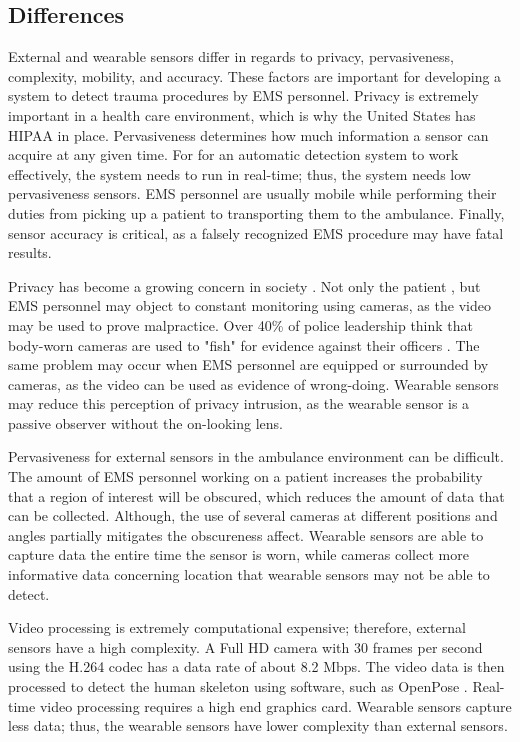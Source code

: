 \subsection{Differences}
External and wearable sensors differ in regards to privacy, pervasiveness, complexity, mobility, and accuracy. These factors are important for developing a system to detect trauma procedures by EMS personnel. Privacy is extremely important in a health care environment, which is why the United States has HIPAA in place. Pervasiveness determines how much information a sensor can acquire at any given time. For for an automatic detection system to work effectively, the system needs to run in real-time; thus, the system needs low pervasiveness sensors. EMS personnel are usually mobile while performing their duties from picking up a patient to transporting them to the ambulance. Finally, sensor accuracy is critical, as a falsely recognized EMS procedure may have fatal results.
\par Privacy has become a growing concern in society \cite{privacyindex}. Not only the patient \cite{Arning2015}, but EMS personnel may object to constant monitoring using cameras, as the video may be used to prove malpractice. Over 40\% of police leadership think that body-worn cameras are used to "fish" for evidence against their officers \cite{Smykla2016}. The same problem may occur when EMS personnel are equipped or surrounded by cameras, as the video can be used as evidence of wrong-doing. Wearable sensors may reduce this perception of privacy intrusion, as the wearable sensor is a passive observer without the on-looking lens.
\par Pervasiveness for external sensors in the ambulance environment can be difficult. The amount of EMS personnel working on a patient increases the probability that a region of interest will be obscured, which reduces the amount of data that can be collected. Although, the use of several cameras at different positions and angles partially mitigates the obscureness affect. Wearable sensors are able to capture data the entire time the sensor is worn, while cameras collect more informative data concerning location that wearable sensors may not be able to detect.
\par Video processing is extremely computational expensive; therefore, external sensors have a high complexity. A Full HD camera with 30 frames per second using the H.264 codec has a data rate of about 8.2 Mbps. The video data is then processed to detect the human skeleton using software, such as OpenPose \cite{openpose}. Real-time video processing requires a high end graphics card. Wearable sensors capture less data; thus, the wearable sensors have lower complexity than external sensors.
